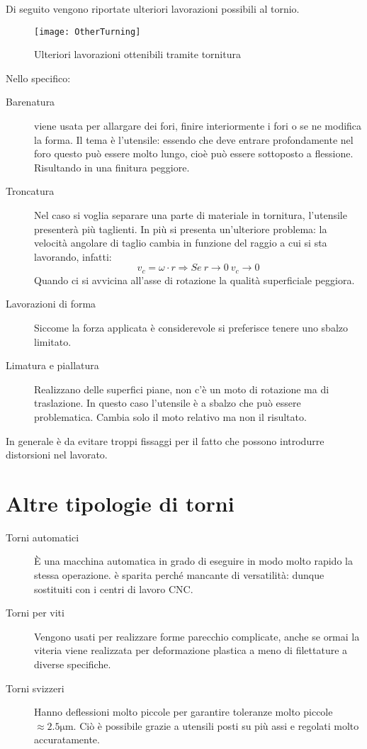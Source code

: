 Di seguito vengono riportate ulteriori lavorazioni possibili al tornio.

\begin{figure}
\centering
\texttt{[image: OtherTurning]}
\caption{Ulteriori lavorazioni ottenibili tramite tornitura}
\label{fig:OtherTurning}
\end{figure}

Nello specifico:
\begin{description}
\item[Barenatura] viene usata per allargare dei fori, finire interiormente i fori o se ne modifica la forma.
Il tema è l'utensile: essendo che deve entrare profondamente nel foro questo può essere molto lungo, cioè può essere sottoposto a flessione. Risultando in una finitura peggiore.
\item[Troncatura] Nel caso si voglia separare una parte di materiale in tornitura, l'utensile presenterà più taglienti.
In più si presenta un'ulteriore problema: la velocità angolare di taglio cambia in funzione del raggio a cui si sta lavorando, infatti:
\begin{equation}
v_c = \omega \cdot r \Rightarrow Se \: r \rightarrow 0 \: v_c \rightarrow 0
\end{equation}
Quando ci si avvicina all'asse di rotazione la qualità superficiale peggiora.
\item[Lavorazioni di forma] Siccome la forza applicata è considerevole si preferisce tenere uno sbalzo limitato.
\item[Limatura e piallatura] Realizzano delle superfici piane, non c'è un moto di rotazione ma di traslazione. In questo caso l'utensile è a sbalzo che può essere problematica.
Cambia solo il moto relativo ma non il risultato.
\end{description}

In generale è da evitare troppi fissaggi per il fatto che possono introdurre distorsioni nel lavorato.

\section{Altre tipologie di torni}
\begin{description}
\item[Torni automatici] È una macchina automatica in grado di eseguire in modo molto rapido la stessa operazione. è sparita perché mancante di versatilità: dunque sostituiti con i centri di lavoro \ac{CNC}.
\item[Torni per viti] Vengono usati per realizzare forme parecchio complicate, anche se ormai la viteria viene realizzata per deformazione plastica a meno di filettature a diverse specifiche.
\item[Torni svizzeri] Hanno deflessioni molto piccole per garantire toleranze molto piccole $\approx 2.5\unit{\um}$. Ciò è possibile grazie a utensili posti su più assi e regolati molto accuratamente.
\end{description}

